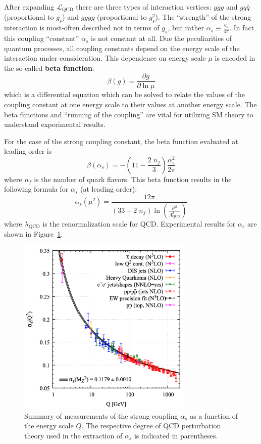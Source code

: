 After expanding $\mathcal{L}_{\mathrm{QCD}}$ there are three types of interaction vertices: $ggg$ and $gq\bar{q}$ (proportional to $g_s$) and $gggg$ (proportional to $g_s^2$).
The ``strength'' of the strong interaction is most-often described not in terms of $g_s$, but rather $\alpha_s \equiv \frac{g_s}{4\pi}$.
In fact this coupling ``constant'' $\alpha_s$ is not constant at all.
Due the peculiarities of quantum processes, all coupling constants depend on the energy scale of the interaction under consideration.
This dependence on energy scale $\mu$ is encoded in the so-called \textbf{beta function}:
\begin{equation}
\beta(g) = \frac{\partial g}{\partial \ln \mu}
\end{equation}
which is a differential equation which can be solved to relate the values of the coupling constant at one energy scale to their values at another energy scale.
The beta functions and ``running of the coupling'' are vital for utilizing SM theory to understand experimental results.

For the case of the strong coupling constant, the beta function evaluated at leading order is
\begin{equation}
    \beta(\alpha_s) = -\left(11 - \frac{2\; n_f}{3}\right) \frac{\alpha_s^2}{2\pi}
\end{equation}
where $n_f$ is the number of quark flavors.
This beta function results in the following formula for $\alpha_s$ (at leading order):
\begin{equation}
    \alpha_s(\mu^2) = \frac{12\pi}{(33 - 2\;n_f) \ln (\frac{\mu^2}{\Lambda_{\mathrm{QCD}}^2})}
\end{equation}
where $\lambda_{\mathrm{QCD}}$ is the renormalization scale for QCD.
Experimental results for $\alpha_s$ are shown in Figure~\ref{fig:alpha_s_measurements}.

\begin{figure}
	\centering
	\includegraphics[width=0.75\textwidth]{alpha_s_measurements}
	\caption{
	Summary of measurements of the strong coupling $\alpha_s$ as a function of the energy scale $Q$.
	The respective degree of QCD perturbation theory used in the extraction of $\alpha_s$ is indicated in parentheses.
	\cite{PDG:PhysRevD.98.030001}
	}
	\label{fig:alpha_s_measurements}
\end{figure}

